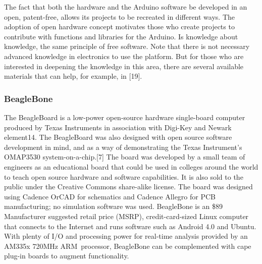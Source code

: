 \documentclass{acm_proc_article-sp}
\begin{document}
The fact that both the hardware and the Arduino software be developed in an open, patent-free, allows its projects to be recreated in different ways. The adoption of open hardware concept motivates those who create projects to contribute with functions and libraries for the Arduino. Is knowledge about knowledge, the same principle of free software.
\newline
\newline
Note that there is not necessary advanced knowledge in electronics to use the platform. But for those who are interested in deepening the knowledge in this area, there are several available materials that can help, for example, in [19].

\subsubsection{BeagleBone}
The BeagleBoard is a low-power open-source hardware single-board computer produced by Texas Instruments in association with Digi-Key and Newark element14. The BeagleBoard was also designed with open source software development in mind, and as a way of demonstrating the Texas Instrument's OMAP3530 system-on-a-chip.[7] The board was developed by a small team of engineers as an educational board that could be used in colleges around the world to teach open source hardware and software capabilities. It is also sold to the public under the Creative Commons share-alike license. The board was designed using Cadence OrCAD for schematics and Cadence Allegro for PCB manufacturing; no simulation software was used.
\newline\newline
BeagleBone is an \$89 Manufacturer suggested retail price (MSRP), credit-card-sized Linux computer that connects to the Internet and runs software such as Android 4.0 and Ubuntu. With plenty of I/O and processing power for real-time analysis provided by an AM335x 720MHz ARM\textregistered\, processor, BeagleBone can be complemented with cape plug-in boards to augment functionality.
\end{document}
